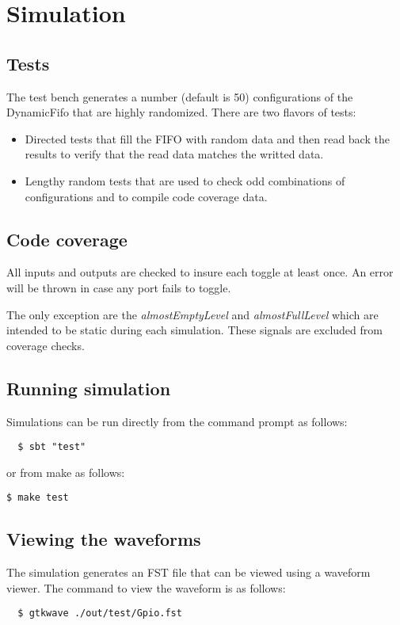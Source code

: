 \section{Simulation}

\subsection{Tests}
The test bench generates a number (default is 50) configurations of the
DynamicFifo that are highly randomized. There are two flavors of tests:

\begin{itemize}
  \item {Directed tests that fill the FIFO with random data and then read back
        the results to verify that the read data matches the writted data.}
  \item {Lengthy random tests that are used to check odd combinations of
        configurations and to compile code coverage data.}
\end{itemize}

\subsection{Code coverage}
All inputs and outputs are checked to insure each toggle at least once. An error
will be thrown in case any port fails to toggle.

The only exception are the \emph{almostEmptyLevel} and \emph{almostFullLevel}
which are intended to be static during each simulation. These signals are
excluded from coverage checks.

\subsection{Running simulation}

Simulations can be run directly from the command prompt as follows:

\begin{verbatim}
  $ sbt "test"
\end{verbatim}

or from make as follows:

\texttt{\$ make test}

\subsection{Viewing the waveforms}

The simulation generates an FST file that can be viewed using a waveform viewer. The command to view the waveform is as follows:
\begin{verbatim}
  $ gtkwave ./out/test/Gpio.fst
\end{verbatim}
